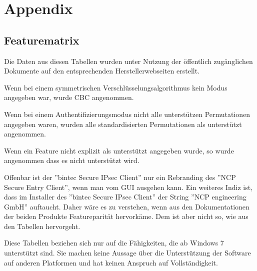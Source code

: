 



\section{Appendix}
\label{sec:appendix}

\subsection{Featurematrix}
Die Daten aus diesen Tabellen wurden unter Nutzung der öffentlich zugänglichen
Dokumente auf den entsprechenden Herstellerwebseiten erstellt.

Wenn bei einem symmetrischen Verschlüsselungsalgorithmus kein Modus angegeben
war, wurde \ac{CBC} angenommen.

Wenn bei einem Authentifizierungsmodus nicht alle unterstützen Permutationen
angegeben waren, wurden alle standardisierten Permutationen als unterstützt 
angenommen.

Wenn ein Feature nicht explizit als unterstützt angegeben wurde, so wurde angenommen
dass es nicht unterstützt wird.

Offenbar ist der ''bintec Secure IPsec Client'' nur ein Rebranding des ''NCP Secure Entry Client'',
wenn man vom \ac{GUI} ausgehen kann. 
Ein weiteres Indiz ist, dass im Installer des ''bintec Secure IPsec Client''
der String ''NCP engineering GmbH'' auftaucht. Daher wäre es zu verstehen,
wenn aus den Dokumentationen der beiden Produkte Featureparität hervorkäme.
Dem ist aber nicht so, wie aus den Tabellen hervorgeht.

Diese Tabellen beziehen sich nur auf die Fähigkeiten, die ab Windows 7 unterstützt sind.
Sie machen keine Aussage über die Unterstützung der Software auf anderen Platformen
und hat keinen Anspruch auf Vollständigkeit.

